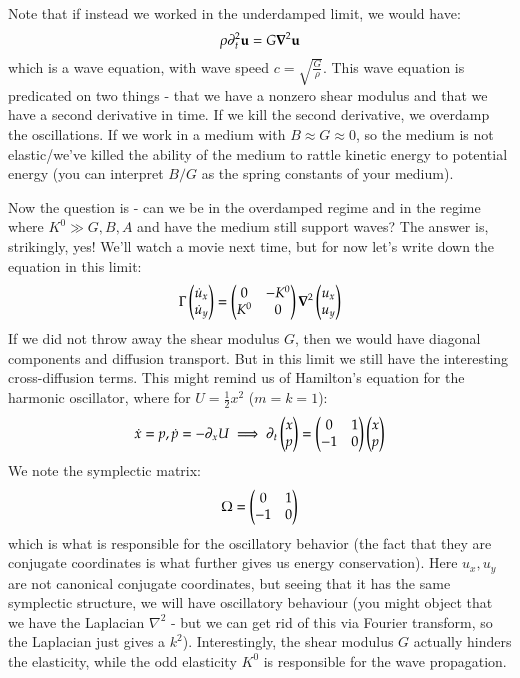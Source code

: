 Note that if instead we worked in the underdamped limit, we would have:
\begin{equation}
    \rho \p_t^2 \v{u} = G\nabla^2 \v{u}
\end{equation}
which is a wave equation, with wave speed $c = \sqrt{\frac{G}{\rho}}$. This wave equation is predicated on two things - that we have a nonzero shear modulus and that we have a second derivative in time. If we kill the second derivative, we overdamp the oscillations. If we work in a medium with $B \approx G \approx 0$, so the medium is not elastic/we've killed the ability of the medium to rattle kinetic energy to potential energy (you can interpret $B/G$ as the spring constants of your medium). 

Now the question is - can we be in the overdamped regime and in the regime where $K^0 \gg G, B, A$ and have the medium still support waves? The answer is, strikingly, yes! We'll watch a movie next time, but for now let's write down the equation in this limit:
\begin{equation}
    \Gamma\m{\dot{u}_x\\\dot{u}_y} = \m{0 & -K^0 \\ K^0 & 0}\nabla^2\m{u_x \\ u_y}
\end{equation}
If we did not throw away the shear modulus $G$, then we would have diagonal components and diffusion transport. But in this limit we still have the interesting cross-diffusion terms. This might remind us of Hamilton's equation for the harmonic oscillator, where for $U = \frac{1}{2}x^2$ ($m=k=1$):
\begin{equation}
    \dot{x} = p, \dot{p} = -\partial_x U \implies \partial_t\begin{pmatrix}x \\ p\end{pmatrix} = \begin{pmatrix}0 & 1 \\ -1 & 0\end{pmatrix}\begin{pmatrix}x \\ p\end{pmatrix}
\end{equation}
We note the symplectic matrix:
\begin{equation}
    \Omega = \begin{pmatrix}0 & 1 \\ -1 & 0\end{pmatrix}
\end{equation}
which is what is responsible for the oscillatory behavior (the fact that they are conjugate coordinates is what further gives us energy conservation). Here $u_x, u_y$ are not canonical conjugate coordinates, but seeing that it has the same symplectic structure, we will have oscillatory behaviour (you might object that we have the Laplacian $\nabla^2$ - but we can get rid of this via Fourier transform, so the Laplacian just gives a $k^2$). Interestingly, the shear modulus $G$ actually hinders the elasticity, while the odd elasticity $K^0$ is responsible for the wave propagation.


